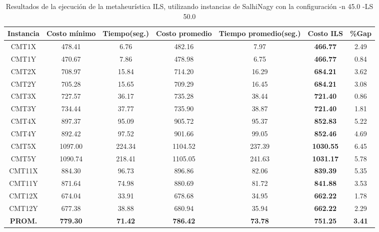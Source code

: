 \begin{table}[ht]
\caption{Resultados de la ejecución de la metaheurística ILS, utilizando instancias de SalhiNagy con la configuración -n 45.0 -LS 50.0}
\centering
\small
\begin{tabular}{c c c c c c c}
\hline\hline
Instancia & Costo mínimo & Tiempo(seg.) & Costo promedio & Tiempo promedio(seg.) & Costo ILS & \%Gap \\ [0.5ex]
\hline
CMT1X & 478.41 & 6.76 & 
482.16 & 7.97 & \bf{466.77} & 
2.49\\CMT1Y & 470.67 & 7.86 & 
478.98 & 6.75 & \bf{466.77} & 
0.84\\CMT2X & 708.97 & 15.84 & 
714.20 & 16.29 & \bf{684.21} & 
3.62\\CMT2Y & 705.28 & 15.65 & 
709.29 & 16.45 & \bf{684.21} & 
3.08\\CMT3X & 727.57 & 36.17 & 
735.28 & 38.44 & \bf{721.40} & 
0.86\\CMT3Y & 734.44 & 37.77 & 
735.90 & 38.87 & \bf{721.40} & 
1.81\\CMT4X & 897.37 & 95.09 & 
905.72 & 95.37 & \bf{852.83} & 
5.22\\CMT4Y & 892.42 & 97.52 & 
901.66 & 99.05 & \bf{852.46} & 
4.69\\CMT5X & 1097.00 & 224.34 & 
1104.52 & 237.39 & \bf{1030.55} & 
6.45\\CMT5Y & 1090.74 & 218.41 & 
1105.05 & 241.63 & \bf{1031.17} & 
5.78\\CMT11X & 884.30 & 96.73 & 
896.86 & 82.06 & \bf{839.39} & 
5.35\\CMT11Y & 871.64 & 74.98 & 
880.69 & 81.72 & \bf{841.88} & 
3.53\\CMT12X & 674.04 & 33.91 & 
678.68 & 34.95 & \bf{662.22} & 
1.78\\CMT12Y & 677.38 & 38.88 & 
680.94 & 35.94 & \bf{662.22} & 
2.29\\\bf{PROM.} & 
\bf{779.30} & \bf{71.42} & \bf{786.42} & \bf{73.78} & \bf{751.25} & \bf{3.41}\\[1ex]\hline
\end{tabular}
\label{table:nonlin}
\end{table} \clearpage
